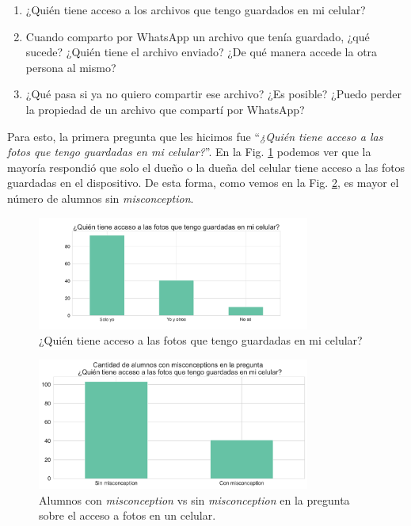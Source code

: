 \begin{enumerate}
    \item ¿Quién tiene acceso a los archivos que tengo guardados en mi celular?
    \item Cuando comparto por WhatsApp un archivo que tenía guardado, ¿qué sucede? ¿Quién tiene el archivo enviado? ¿De qué manera accede la otra persona al mismo?
    \item ¿Qué pasa si ya no quiero compartir ese archivo? ¿Es posible? ¿Puedo perder la propiedad de un archivo que compartí por WhatsApp?
\end{enumerate}

\newpage

Para esto, la primera pregunta que les hicimos fue ``\textit{¿Quién tiene acceso a las fotos que tengo guardadas en mi celular?}''. En la Fig. \ref{fig:analisis11} podemos ver que la mayoría respondió que solo el dueño o la dueña del celular tiene acceso a las fotos guardadas en el dispositivo. De esta forma, como vemos en la Fig. \ref{fig:analisis10}, es mayor el número de alumnos sin \textit{misconception}.

\begin{figure}[h]
    \centering
    \includegraphics[width=0.8\textwidth]{images_analisis/11.pdf} 
    \caption{¿Quién tiene acceso a las fotos que tengo guardadas en mi celular?}
    \label{fig:analisis11}	
\end{figure}

\begin{figure}[h]
    \centering
    \includegraphics[width=0.8\textwidth]{images_analisis/10.pdf}
    \caption{Alumnos con \textit{misconception} vs sin \textit{misconception} en la pregunta sobre el acceso a fotos en un celular.}
    \label{fig:analisis10}
\end{figure}

